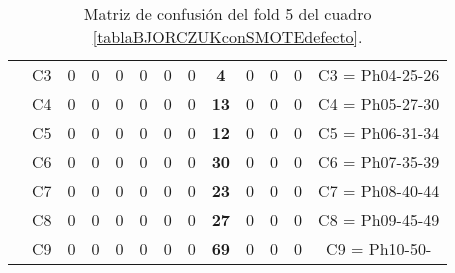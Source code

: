\begin{table}[H]
{\begin{tabular}{|ccrrrrrrrrrrc|}
\multicolumn{1}{|c|}{}                                      & \multicolumn{1}{c|}{C3} & \multicolumn{1}{c|}{0}  & \multicolumn{1}{c|}{0}  & \multicolumn{1}{c|}{0}  & \multicolumn{1}{c|}{0}  & \multicolumn{1}{c|}{0}  & \multicolumn{1}{c|}{0}  & \multicolumn{1}{c|}{\textbf{4}}  & \multicolumn{1}{c|}{0}  & \multicolumn{1}{c|}{0}  & \multicolumn{1}{c|}{0}  & C3 = Ph04-25-26   \\ \cline{2-13}
\multicolumn{1}{|c|}{}                                      & \multicolumn{1}{c|}{C4} & \multicolumn{1}{c|}{0}  & \multicolumn{1}{c|}{0}  & \multicolumn{1}{c|}{0}  & \multicolumn{1}{c|}{0}  & \multicolumn{1}{c|}{0}  & \multicolumn{1}{c|}{0}  & \multicolumn{1}{c|}{\textbf{13}} & \multicolumn{1}{c|}{0}  & \multicolumn{1}{c|}{0}  & \multicolumn{1}{c|}{0}  & C4 = Ph05-27-30   \\ \cline{2-13}
\multicolumn{1}{|c|}{}                                      & \multicolumn{1}{c|}{C5} & \multicolumn{1}{c|}{0}  & \multicolumn{1}{c|}{0}  & \multicolumn{1}{c|}{0}  & \multicolumn{1}{c|}{0}  & \multicolumn{1}{c|}{0}  & \multicolumn{1}{c|}{0}  & \multicolumn{1}{c|}{\textbf{12}} & \multicolumn{1}{c|}{0}  & \multicolumn{1}{c|}{0}  & \multicolumn{1}{c|}{0}  & C5 = Ph06-31-34   \\ \cline{2-13}
\multicolumn{1}{|c|}{}                                      & \multicolumn{1}{c|}{C6} & \multicolumn{1}{c|}{0}  & \multicolumn{1}{c|}{0}  & \multicolumn{1}{c|}{0}  & \multicolumn{1}{c|}{0}  & \multicolumn{1}{c|}{0}  & \multicolumn{1}{c|}{0}  & \multicolumn{1}{c|}{\textbf{30}} & \multicolumn{1}{c|}{0}  & \multicolumn{1}{c|}{0}  & \multicolumn{1}{c|}{0}  & C6 = Ph07-35-39   \\ \cline{2-13}
\multicolumn{1}{|c|}{}                                      & \multicolumn{1}{c|}{C7} & \multicolumn{1}{c|}{0}  & \multicolumn{1}{c|}{0}  & \multicolumn{1}{c|}{0}  & \multicolumn{1}{c|}{0}  & \multicolumn{1}{c|}{0}  & \multicolumn{1}{c|}{0}  & \multicolumn{1}{c|}{\textbf{23}} & \multicolumn{1}{c|}{0}  & \multicolumn{1}{c|}{0}  & \multicolumn{1}{c|}{0}  & C7 = Ph08-40-44   \\ \cline{2-13}
\multicolumn{1}{|c|}{}                                      & \multicolumn{1}{c|}{C8} & \multicolumn{1}{c|}{0}  & \multicolumn{1}{c|}{0}  & \multicolumn{1}{c|}{0}  & \multicolumn{1}{c|}{0}  & \multicolumn{1}{c|}{0}  & \multicolumn{1}{c|}{0}  & \multicolumn{1}{c|}{\textbf{27}} & \multicolumn{1}{c|}{0}  & \multicolumn{1}{c|}{0}  & \multicolumn{1}{c|}{0}  & C8 = Ph09-45-49   \\ \cline{2-13}
\multicolumn{1}{|c|}{}                                      & \multicolumn{1}{c|}{C9} & \multicolumn{1}{c|}{0}  & \multicolumn{1}{c|}{0}  & \multicolumn{1}{c|}{0}  & \multicolumn{1}{c|}{0}  & \multicolumn{1}{c|}{0}  & \multicolumn{1}{c|}{0}  & \multicolumn{1}{c|}{\textbf{69}} & \multicolumn{1}{c|}{0}  & \multicolumn{1}{c|}{0}  & \multicolumn{1}{c|}{0}  & C9 = Ph10-50-     \\ \hline
\end{tabular}%
}
\caption{Matriz de confusión del fold 5 del cuadro \ref{tablaBJORCZUKconSMOTEdefecto}.}
\end{table}


